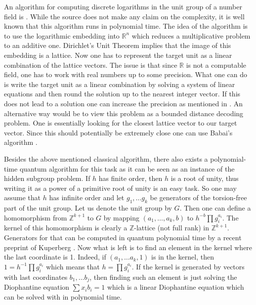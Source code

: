     An algorithm for computing discrete logarithms in the unit group of a number field is \cite[Algorithm 5.3.10]{cohen2012advanced}. While the source does not make any claim on the complexity, it is well known that this algorithm runs in polynomial time. The idea of the algorithm is to use the logarithmic embedding into $\mathbb{R}^n$ which reduces a multiplicative problem to an additive one. Dirichlet's Unit Theorem implies that the image of this embedding is a lattice. Now one has to represent the target unit as a linear combination of the lattice vectors. The issue is that since $\mathbb{R}$ is not a computable field, one has to work with real numbers up to some precision. What one can do is write the target unit as a linear combination by solving a system of linear equations and then round the solution up to the nearest integer vector. If this does not lead to a solution one can increase the precision as mentioned in \cite[Algorithm 5.3.10]{cohen2012advanced}. An alternative way would be to view this problem as a bounded distance decoding problem. One is essentially looking for the closest lattice vector to our target vector. Since this should potentially be extremely close one can use Babai's algorithm \cite{babai1986lovasz}. 
    
Besides the above mentioned classical algorithm, there also exists a polynomial-time quantum algorithm for this task as it can be seen as an instance of the hidden subgroup problem. If $h$ has finite order, then $h$ is a root of unity, thus writing it as a power of a primitive root of unity is an easy task. So one may assume that $h$ has infinite order and let $g_1,\dots g_k$ be generators of the torsion-free part of the unit group. Let us denote the unit group by $G$. Then one can define a homomorphism from $\mathbb{Z}^{k+1}$ to $G$ by mapping $(a_1,\dots,a_k,b)$ to $h^{-b}\prod g_i^{a_i}$. 
The kernel of this homomorphism is clearly a $\mathbb{Z}$-lattice (not full rank) in $\mathbb{Z}^{k+1}$. Generators for that can be computed in quantum polynomial time by a recent preprint of Kuperberg \cite[Theorem 4]{kuperberghidden}. Now what is left is to find an element in the kernel where the last coordinate is 1. Indeed, if $(a_1,\dots a_k,1)$ is in the kernel, then $1=h^{-1}\prod g_i^{a_i}$ which means that $h=\prod g_i^{a_i}$. If the kernel is generated by vectors with last coordinates $b_1,\dots b_j$, then finding such an element is just solving the Diophantine equation $\sum x_ib_i=1$ which is a linear Diophantine equation which can be solved with in polynomial time. 

